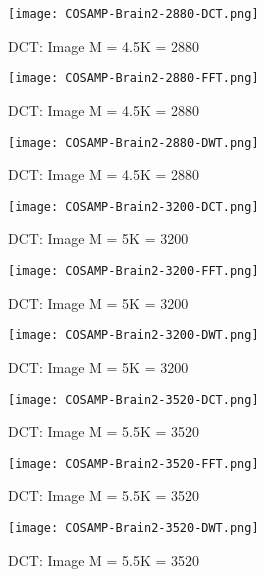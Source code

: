\documentclass[titlepage,oneside, 12pt]{book}
\theoremstyle{break}
\begin{document}
\begin{figure}[!h]
\centering
{}
  \texttt{[image: COSAMP-Brain2-2880-DCT.png]}
  \caption{DCT: Image M = 4.5K = 2880}\label{fig:COSAMP-Brain2-2880-DCT}
\endminipage
\hspace*{2em}
  \texttt{[image: COSAMP-Brain2-2880-FFT.png]}
  \caption{DCT: Image M = 4.5K = 2880}\label{fig:COSAMP-Brain2-2880-FFT}
\endminipage
\hspace*{2em}
  \texttt{[image: COSAMP-Brain2-2880-DWT.png]}
  \caption{DCT: Image M = 4.5K = 2880}\label{fig:COSAMP-Brain2-2880-DWT}
\endminipage
\hspace*{2em}
\end{figure}


\begin{figure}[!h]
\centering
{}
  \texttt{[image: COSAMP-Brain2-3200-DCT.png]}
  \caption{DCT: Image M = 5K = 3200}\label{fig:COSAMP-Brain2-3200-DCT}
\endminipage
\hspace*{2em}
  \texttt{[image: COSAMP-Brain2-3200-FFT.png]}
  \caption{DCT: Image M = 5K = 3200}\label{fig:COSAMP-Brain2-3200-FFT}
\endminipage
\hspace*{2em}
  \texttt{[image: COSAMP-Brain2-3200-DWT.png]}
  \caption{DCT: Image M = 5K = 3200}\label{fig:COSAMP-Brain2-3200-DWT}
\endminipage
\hspace*{2em}
\end{figure}

\clearpage
\begin{figure}[!h]
\centering
{}
  \texttt{[image: COSAMP-Brain2-3520-DCT.png]}
  \caption{DCT: Image M = 5.5K = 3520}\label{fig:COSAMP-Brain2-3520-DCT}
\endminipage
\hspace*{2em}
  \texttt{[image: COSAMP-Brain2-3520-FFT.png]}
  \caption{DCT: Image M = 5.5K = 3520}\label{fig:COSAMP-Brain2-3520-FFT}
\endminipage
\hspace*{2em}
  \texttt{[image: COSAMP-Brain2-3520-DWT.png]}
  \caption{DCT: Image M = 5.5K = 3520}\label{fig:COSAMP-Brain2-3520-DWT}
\endminipage
\hspace*{2em}
\end{figure}
\end{document}
